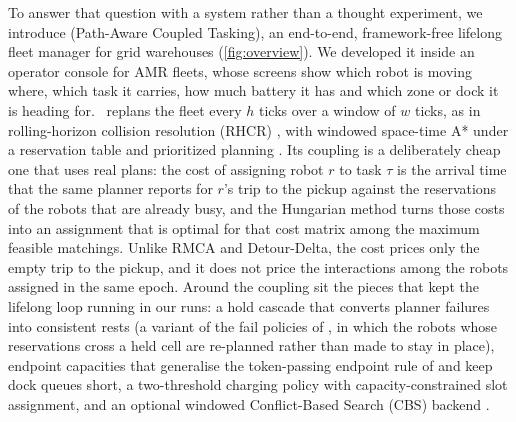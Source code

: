 To answer that question with a system rather than a thought experiment, we
introduce \emph{\sname} (Path-Aware Coupled Tasking), an end-to-end,
framework-free lifelong fleet manager for grid warehouses
(\cref{fig:overview}). We developed it inside an operator console for AMR
fleets, whose screens show which robot is moving where, which task it carries,
how much battery it has and which zone or dock it is heading for. \sname\ replans the fleet every $h$ ticks over a window
of $w$ ticks, as in rolling-horizon collision resolution (RHCR) \citep{li2021rhcr}, with windowed space-time A*
\citep{silver2005cooperative} under a reservation table and prioritized
planning \citep{erdmann1987multiple}. Its coupling is a deliberately
cheap one that uses real plans: the cost of assigning robot $r$ to task
$\tau$ is the arrival time that the same planner reports for $r$'s trip to
the pickup against the reservations of the robots that are already busy, and
the Hungarian method \citep{kuhn1955hungarian} turns those costs into an
assignment that is optimal for that cost matrix among the maximum feasible matchings. Unlike RMCA and
Detour-Delta, the cost prices only the empty trip to the pickup, and it does
not price the interactions among the robots assigned in the same epoch.
Around the coupling sit the pieces that kept the lifelong
loop running in our runs: a hold cascade that converts planner failures into consistent
rests (a variant of the fail policies of \citet{morag2023adapting}, in which
the robots whose reservations cross a held cell are re-planned rather than
made to stay in place), endpoint capacities that generalise the
token-passing endpoint rule of \citet{ma2017lifelong} and keep dock
queues short, a two-threshold charging policy with capacity-constrained slot
assignment, and an optional windowed Conflict-Based Search (CBS) backend
\citep{sharon2015cbs}.

